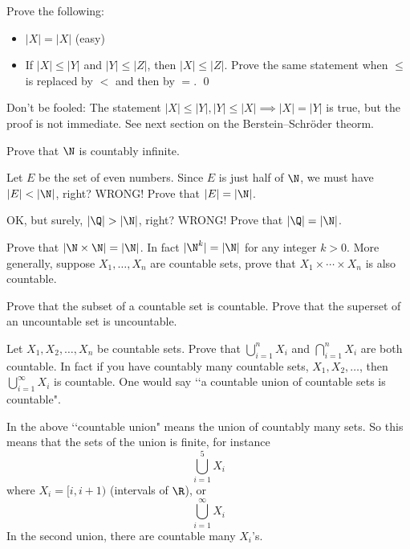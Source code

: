 \newpage
\begin{ex}
  Prove the following:
  \begin{itemize}
  \item $|X| = |X|$ (easy)
  \item
  If $|X| \leq |Y|$ and $|Y| \leq |Z|$, then $|X| \leq |Z|$.
  Prove the same statement when $\leq$ is replaced by $<$ and then by
  $=$.
  \qed
  \end{itemize}
\end{ex}

Don't be fooled: The statement $|X| \leq |Y|, |Y| \leq |X| \implies
|X| = |Y|$ is true, but the proof is not immediate.
See next section on the Berstein--Schr\"oder theorm.

\newpage
\begin{ex}
Prove that $\N$ is countably infinite.
\end{ex}


\newpage
\begin{ex}
Let $E$ be the set of even numbers. Since $E$ is just half of $\N$,
we must have $|E| < |\N|$, right? WRONG! Prove that $|E| = |\N|$.
\end{ex}

\newpage
\begin{ex}
OK, but surely, $|\Q| > |\N|$, right? WRONG! Prove that $|\Q| =
|\N|$.
\end{ex}

\newpage
\begin{ex}
Prove that $|\N \times \N| = |\N|$. In fact $|\N^k| = |\N|$ for any
integer $k>0$. More generally, suppose $X_1, \ldots, X_n$ are
countable sets, prove that $X_1 \times \cdots \times X_n$ is also
countable.
\end{ex}

\newpage
\begin{ex}
  Prove that the subset of a countable set is countable.
  Prove that the superset of an uncountable set is uncountable.
\end{ex}

\newpage
\begin{ex}
Let $X_1, X_2, \ldots, X_n$ be countable sets. Prove that
$\bigcup_{i=1}^n X_i$ and $\bigcap_{i=1}^n X_i$ are both
countable.
In fact if you have countably many countable sets,
$X_1, X_2, \ldots$, then
$\bigcup_{i=1}^\infty X_i$ is countable.
One would say
\lq\lq a countable union of countable sets is countable".
\end{ex}

In the above \lq\lq countable union" means the union of
countably many sets.
So this means that the sets of the union is finite, for instance
\[
\bigcup_{i=1}^5 X_i
\]
where $X_i = [i, i + 1)$ (intervals of $\R$), or
\[
\bigcup_{i=1}^\infty X_i
\]
In the second union, there are countable many $X_i$'s.

